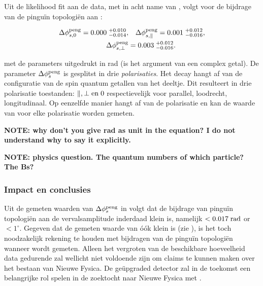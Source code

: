Uit de likelihood fit aan de data, met in acht name van \cite{Fleischer:1999zi,Faller:2008gt,DeBruyn:2014oga,DeBruyn-thesis}, volgt voor de bijdrage van de pingu\"in topologi\"en aan \phis:


\begin{align}
\label{app_delta_phis_result}
  \Delta\phi^{\rm peng}_{s,{0}}         = 0.000 \; ^{+0.010}_{-0.014}, &\quad  \Delta\phi^{\rm peng}_{s,{\parallel}} = 0.001 \; ^{+0.012}_{-0.016}, \nonumber \\
  \Delta\phi^{\rm peng}_{s,{\perp}}     &= 0.003 \; ^{+0.012}_{-0.016}.
\end{align}


\noindent met de parameters uitgedrukt in rad (\phis is het argument van een complex getal). De parameter $\Delta\phi_{s}^{\tiny\text{peng}}$ is gesplitst in drie {\it polarisaties}. Het decay  \BsJpsiPhi hangt af van de configuratie van de spin quantum getallen van het deeltje. Dit resulteert in drie polarisatie toestanden: $\parallel,\perp {\rm en}\; 0$ respectievelijk voor parallel, loodrecht, longitudinaal. Op eenzelfde manier hangt \phis af van de polarisatie en kan de waarde van \phis voor elke polarisatie worden gemeten.


\textbf{NOTE: why don't you give rad as unit in the equation? I do not understand why to say it explicitly.}

\textbf{NOTE: physics question. The quantum numbers of which particle? The Bs?}

\subsubsection{Impact en conclusies}
Uit de gemeten waarden van $\Delta\phi_{s}^{\tiny\text{peng}}$ in  volgt dat de bijdrage van pingu\"in topologi\"en aan de \BsJpsiPhi vervalsamplitude inderdaad klein is, namelijk  $<0.017 \; {\rm rad}$ or $<1^\circ$. Gegeven dat de gemeten waarde van \phis \'o\'ok klein is (zie ), is het toch noodzakelijk rekening te houden met bijdragen van de pingu\"in topologi\"en wanneer \phis wordt gemeten. Alleen het vergroten van de beschikbare hoeveelheid data gedurende \lhcb \runtwo zal wellicht niet voldoende zijn om claims te kunnen maken over het bestaan van Nieuwe Fysica. De ge\"upgraded \lhcb detector zal in de toekomst een belangrijke rol spelen in de zoektocht naar Nieuwe Fysica met \phis.

